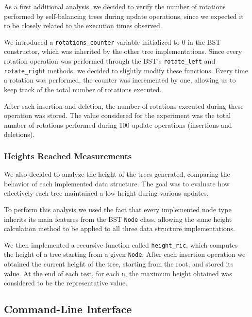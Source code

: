 \documentclass[12pt,a4paper]{article}
\begin{document}
                As a first additional analysis, we decided to verify the number of rotations performed by self-balancing trees during update operations, since we expected it to be closely related to the execution times observed.

                We introduced a \texttt{rotations\_counter} variable initialized to 0 in the BST constructor, which was inherited by the other tree implementations. Since every rotation operation was performed through the BST's \texttt{rotate\_left} and \texttt{rotate\_right} methods, we decided to slightly modify these functions. Every time a rotation was performed, the counter was incremented by one, allowing us to keep track of the total number of rotations executed.

                After each insertion and deletion, the number of rotations executed during these operation was stored. The value considered for the experiment was the total number of rotations performed during 100 update operations (insertions and deletions).

            \subsubsection{Heights Reached Measurements}

                We also decided to analyze the height of the trees generated, comparing the behavior of each implemented data structure. The goal was to evaluate how effectively each tree maintained a low height during various updates.

                To perform this analysis we used the fact that every implemented node type inherits its main features from the BST \texttt{Node} class, allowing the same height calculation method to be applied to all three data structure implementations.

                We then implemented a recursive function called \texttt{height\_ric}, which computes the height of a tree starting from a given \texttt{Node}. After each insertion operation we obtained the current height of the tree, starting from the root, and stored its value. At the end of each test, for each \texttt{n}, the maximum height obtained was considered to be the representative value.

        \subsection{Command-Line Interface}
\end{document}
